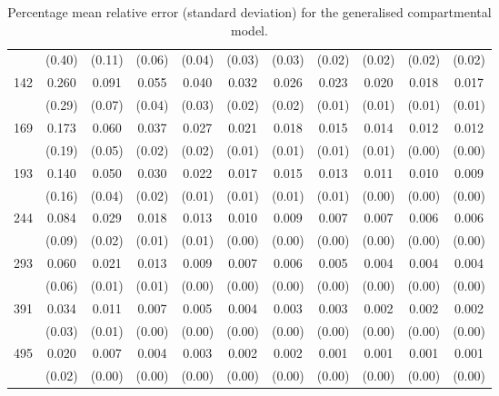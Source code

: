 \begin{table}[!h]
\begin{tabular}{r|cccccccccc}
     & (0.40) & (0.11) & (0.06) & (0.04) & (0.03) & (0.03) & (0.02) & (0.02) & (0.02) & (0.02)\\[2pt]
 142 & 0.260 & 0.091 & 0.055 & 0.040 & 0.032 & 0.026 & 0.023 & 0.020 & 0.018 & 0.017\\[-2pt]
     & (0.29) & (0.07) & (0.04) & (0.03) & (0.02) & (0.02) & (0.01) & (0.01) & (0.01) & (0.01)\\[2pt]
 169 & 0.173 & 0.060 & 0.037 & 0.027 & 0.021 & 0.018 & 0.015 & 0.014 & 0.012 & 0.012\\[-2pt]
     & (0.19) & (0.05) & (0.02) & (0.02) & (0.01) & (0.01) & (0.01) & (0.01) & (0.00) & (0.00)\\[2pt]
 193 & 0.140 & 0.050 & 0.030 & 0.022 & 0.017 & 0.015 & 0.013 & 0.011 & 0.010 & 0.009\\[-2pt]
     & (0.16) & (0.04) & (0.02) & (0.01) & (0.01) & (0.01) & (0.01) & (0.00) & (0.00) & (0.00)\\[2pt]
 244 & 0.084 & 0.029 & 0.018 & 0.013 & 0.010 & 0.009 & 0.007 & 0.007 & 0.006 & 0.006\\[-2pt]
     & (0.09) & (0.02) & (0.01) & (0.01) & (0.00) & (0.00) & (0.00) & (0.00) & (0.00) & (0.00)\\[2pt]
 293 & 0.060 & 0.021 & 0.013 & 0.009 & 0.007 & 0.006 & 0.005 & 0.004 & 0.004 & 0.004\\[-2pt]
     & (0.06) & (0.01) & (0.01) & (0.00) & (0.00) & (0.00) & (0.00) & (0.00) & (0.00) & (0.00)\\[2pt]
 391 & 0.034 & 0.011 & 0.007 & 0.005 & 0.004 & 0.003 & 0.003 & 0.002 & 0.002 & 0.002\\[-2pt]
     & (0.03) & (0.01) & (0.00) & (0.00) & (0.00) & (0.00) & (0.00) & (0.00) & (0.00) & (0.00)\\[2pt]
 495 & 0.020 & 0.007 & 0.004 & 0.003 & 0.002 & 0.002 & 0.001 & 0.001 & 0.001 & 0.001\\[-2pt]
     & (0.02) & (0.00) & (0.00) & (0.00) & (0.00) & (0.00) & (0.00) & (0.00) & (0.00) & (0.00)\\[2pt]
\hline
\end{tabular}
\parbox{5in}{\caption{\label{sd} Percentage mean relative error (standard
deviation) for the generalised compartmental model.}}
\end{table}
